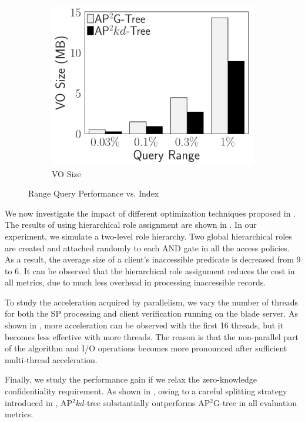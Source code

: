 \begin{figure}[t]
\begin{subfigure}{.33\linewidth}
        \includegraphics[width=\linewidth]{exp-figs/access-control/index_1_vo.pdf}
        \caption{VO Size}
    \end{subfigure}
    \caption{Range Query Performance vs. Index}\label{exp-fig:access-control:index}
\end{figure}

We now investigate the impact of different optimization techniques proposed in . The results of using hierarchical role assignment are shown in . In our experiment, we simulate a two-level role hierarchy. Two global hierarchical roles are created and attached randomly to each AND gate in all the access policies. As a result, the average size of a client's inaccessible predicate is decreased from 9 to 6. It can be observed that the hierarchical role assignment reduces the cost in all metrics, due to much less overhead in processing inaccessible records.

To study the acceleration acquired by parallelism, we vary the number of threads for both the SP processing and client verification running on the blade server. As shown in , more acceleration can be observed with the first 16 threads, but it becomes less effective with more threads. The reason is that the non-parallel part of the algorithm and I/O operations becomes more pronounced after sufficient multi-thread acceleration.

Finally, we study the performance gain if we relax the zero-knowledge confidentiality requirement. As shown in , owing to a careful splitting strategy introduced in , AP$^2kd$-tree substantially outperforms AP$^2$G-tree in all evaluation metrics.

